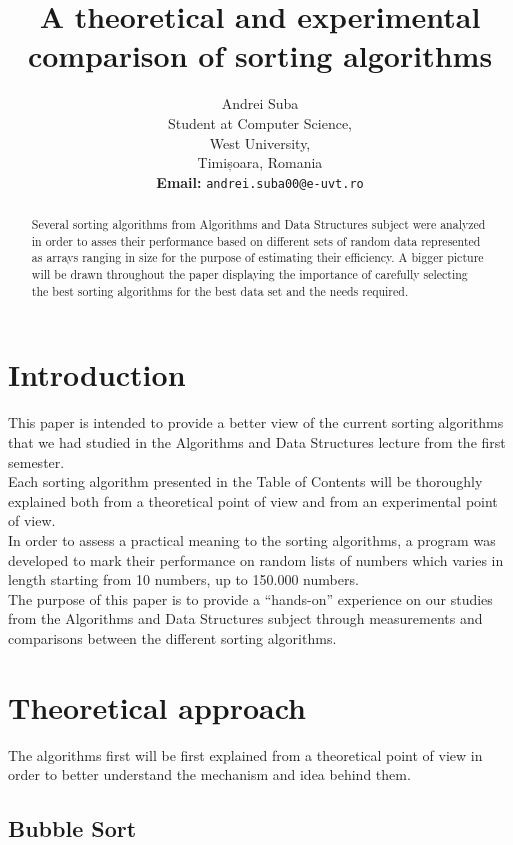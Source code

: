 \documentclass{article}
\title{A theoretical and experimental comparison of sorting algorithms}
\author{Andrei Suba\\
Student at Computer Science,\\
West University,\\
Timișoara, Romania\\
\textbf{Email:} \texttt{andrei.suba00@e-uvt.ro}
}
\begin{document}
\maketitle

\begin{abstract}
Several sorting algorithms from Algorithms and Data Structures subject were analyzed in order to asses their performance based on different sets of random data represented as arrays ranging in size for the purpose of estimating their efficiency. A bigger picture will be drawn throughout the paper displaying the importance of carefully selecting the best sorting algorithms for the best data set and the needs required. 
\end{abstract}

\clearpage

\tableofcontents

\clearpage

\section{Introduction}

This paper is intended to provide a better view of the current sorting algorithms that we had studied in the Algorithms and Data Structures lecture from the first semester.\\
Each sorting algorithm presented in the Table of Contents will be thoroughly explained both from a theoretical point of view and from an experimental point of view.\hfill \break \\
In order to assess a practical meaning to the sorting algorithms, a program was developed to mark their performance on random lists of numbers which varies in length starting from 10 numbers, up to 150.000 numbers.\\
The purpose of this paper is to provide a “hands-on” experience on our studies from the Algorithms and Data Structures subject through measurements and comparisons between the different sorting algorithms.
\clearpage

\section{Theoretical approach}

The algorithms first will be first explained from a theoretical point of view in order to better understand the mechanism and idea behind them.

\subsection{Bubble Sort}
\end{document}
